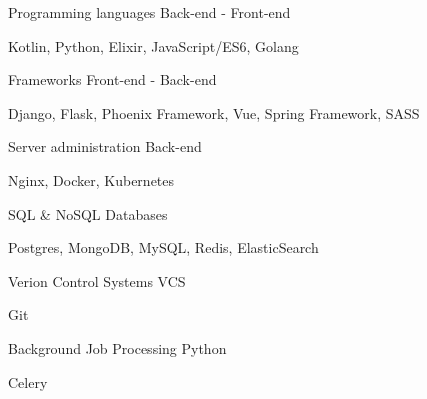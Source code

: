 \begin{cventries}
  \cventry
    {Programming languages}
    {Back-end - Front-end}
    {}
    {}
    {
      \begin{cvitems}
        \item {Kotlin, Python, Elixir, JavaScript/ES6, Golang}
      \end{cvitems}
    }
  \cventry
    {Frameworks}
    {Front-end - Back-end}
    {}
    {}
    {
      \begin{cvitems}
        \item {Django, Flask, Phoenix Framework, Vue, Spring Framework, SASS}
      \end{cvitems}
    }
  \cventry
    {Server administration}
    {Back-end}
    {}
    {}
    {
      \begin{cvitems}
        \item {Nginx, Docker, Kubernetes}
      \end{cvitems}
    }
  \cventry
    {SQL \& NoSQL}
    {Databases}
    {}
    {}
    {
      \begin{cvitems}
        \item {Postgres, MongoDB, MySQL, Redis, ElasticSearch}
      \end{cvitems}
    }
  \cventry
    {Verion Control Systems}
    {VCS}
    {}
    {}
    {
      \begin{cvitems}
        \item {Git}
      \end{cvitems}
    }
  \cventry
    {Background Job Processing}
    {Python}
    {}
    {}
    {
      \begin{cvitems}
        \item {Celery}
      \end{cvitems}
    }
\end{cventries}
